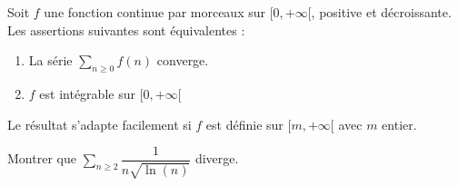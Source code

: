 \documentclass[a4paper,10pt]{report}
\newcommand{\Sum}[2]{\ensuremath{\textstyle{\sum\limits_{#1}^{#2}}}}
\begin{document}
\begin{thm} Soit $f$ une fonction continue par morceaux sur $[0,+ \infty[$, positive et décroissante. Les assertions suivantes sont équivalentes :

\begin{enumerate}
\item La série $\Sum{n \geq 0}{} f(n)$ converge.
\item $f$ est intégrable sur $[0, + \infty[$
\end{enumerate}
\end{thm}

\begin{rem} Le résultat s'adapte facilement si $f$ est définie sur $[m, + \infty[$ avec $m$ entier.
\end{rem} 

\begin{preuve}

\vspace{13.2cm}
\end{preuve}

\begin{exa} Montrer que $\Sum{n \geq 2}{} \dfrac{1}{n \sqrt{\ln(n)}}$ diverge.
\end{exa}
\end{document}
